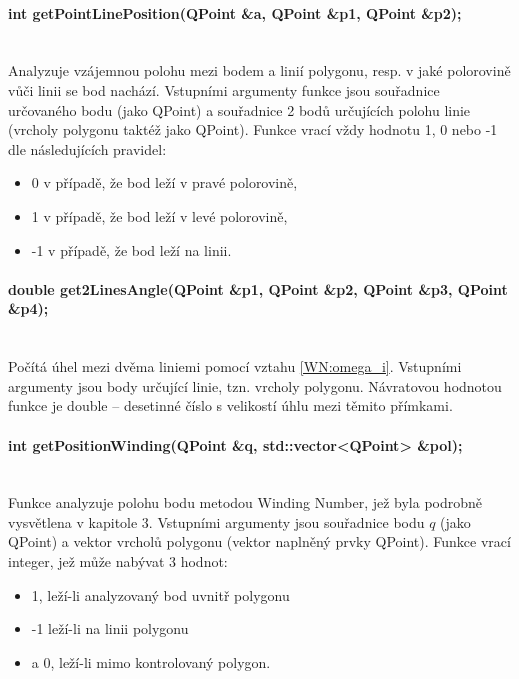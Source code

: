 \documentclass[11pt]{article}
\begin{document}
\paragraph{int getPointLinePosition(QPoint \&a, QPoint \&p1, QPoint \&p2);}\mbox{}\\
Analyzuje vzájemnou polohu mezi bodem a linií polygonu, resp. v jaké polorovině vůči linii se bod nachází. Vstupními argumenty funkce jsou souřadnice určovaného bodu (jako QPoint) a souřadnice 2 bodů určujících polohu linie (vrcholy polygonu taktéž jako QPoint). Funkce vrací vždy hodnotu 1, 0 nebo -1 dle následujících pravidel:

\begin{itemize}
\item 0 v případě, že bod leží v pravé polorovině,
\item 1 v případě, že  bod leží v levé polorovině,
\item -1 v případě, že bod leží na linii.
\end{itemize}

\paragraph{double get2LinesAngle(QPoint \&p1, QPoint \&p2, QPoint \&p3, QPoint \&p4);}\mbox{}\\
Počítá úhel mezi dvěma liniemi pomocí vztahu \ref{WN:omega_i}. Vstupními argumenty jsou body určující linie, tzn. vrcholy polygonu. Návratovou hodnotou funkce je double – desetinné číslo s velikostí úhlu mezi těmito přímkami.  

\paragraph{int getPositionWinding(QPoint \&q, std::vector<QPoint> \&pol);}\mbox{}\\
Funkce analyzuje polohu bodu metodou Winding Number, jež byla podrobně vysvětlena v kapitole 3.  Vstupními argumenty jsou souřadnice bodu $q$ (jako QPoint) a vektor vrcholů polygonu (vektor naplněný prvky QPoint). Funkce vrací integer, jež může nabývat 3 hodnot:

\begin{itemize}
\item 1, leží-li analyzovaný bod uvnitř polygonu
\item -1 leží-li na linii polygonu 
\item a 0, leží-li mimo kontrolovaný polygon.
\end{itemize}
\end{document}
